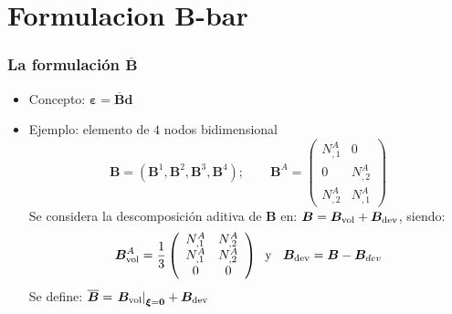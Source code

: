 \documentclass{beamer}
\begin{document}
\section{Formulacion B-bar}
\begin{frame}
\frametitle{La formulación $\overline{\bm{B}}$}
\begin{itemize}
\item Concepto: $\bm{\varepsilon}=\overline{\bm{B}} \bm{d}$
\item Ejemplo: elemento de $4$ nodos bidimensional
$$\bm{B}=(\bm{B}^{1},\bm{B}^2,\bm{B}^3,\bm{B}^4); \qquad
\bm{B}^{A}=\left(
\begin{array}{cc}
N^{A}_{,1}&0\\
0&N^{A}_{,2}\\
N^{A}_{,2}&N^{A}_{,1}
\end{array}
\right)
$$
Se considera la descomposición aditiva de $\bm{B}$ en:
$\bm{B}=\bm{B}_{\rm vol}+\bm{B}_{\rm dev}$,
siendo:
$$\bm{B}^{A}_{\rm vol}=\frac{1}{3}
\left(
\begin{array}{cc}
N^{A}_{,1}&N^{A}_{,2}\\
N^{A}_{,1}&N^{A}_{,2}\\
0&0
\end{array}
\right)
\;\;\mbox{y }\;\; \bm{B}_{\rm dev}=\bm{B}-\bm{B}_{dev}$$
Se define:
$\overline{\bm{B}}=\left. \bm{B}_{\rm vol}\right|_{\bm{\xi}=\bm{0}}+\bm{B}_{\rm dev}$
\end{itemize}
\end{frame}
\end{document}
